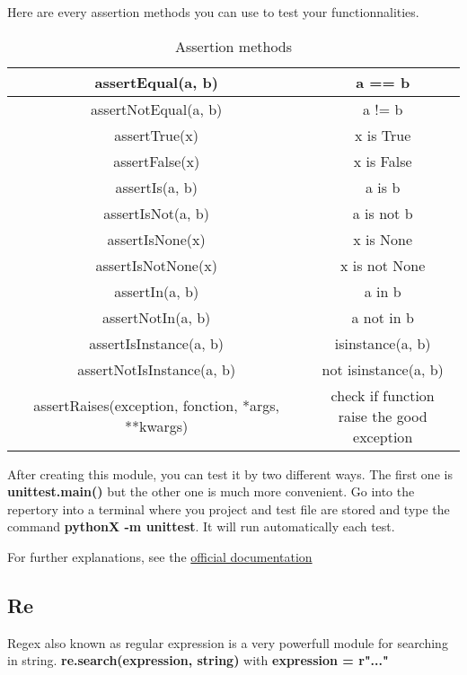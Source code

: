 \documentclass[a4paper, 12pt, titlepage]{scrartcl} %
\begin{document}
Here are every assertion methods you can use to test your functionnalities.
\begin{table}[h]
\begin{center}
{\renewcommand{\arraystretch}{1} %
{\setlength{\tabcolsep}{0.5cm} %
\begin{tabular}{|c|c|}
  \hline
  assertEqual(a, b) & a == b \\
  \hline
  assertNotEqual(a, b) & a != b \\
  \hline
  assertTrue(x) & x is True \\
  \hline
  assertFalse(x) & x is False \\
  \hline
  assertIs(a, b) & a is b \\
  \hline
  assertIsNot(a, b) & a is not b \\
  \hline
  assertIsNone(x) & x is None \\
  \hline
  assertIsNotNone(x) & x is not None \\
  \hline
  assertIn(a, b) & a in b \\
  \hline
  assertNotIn(a, b) & a not in b \\
  \hline
  assertIsInstance(a, b) & isinstance(a, b) \\
  \hline
  assertNotIsInstance(a, b) & not isinstance(a, b) \\
  \hline
  assertRaises(exception, fonction, *args, **kwargs) & \makecell{check if function \\ raise the good exception}  \\
  \hline
\end{tabular}}}
\end{center}
\caption{Assertion methods}
\end{table}

After creating this module, you can test it by two different ways. The first one is \textbf{unittest.main()} but the other one is much more convenient. Go into the repertory into a terminal where you project and test file are stored and type the command \textbf{pythonX -m unittest}. It will run automatically each test.

For further explanations, see the \href{https://docs.python.org/3/library/unittest.html}{official documentation}


\subsection{Re}
Regex also known as regular expression is a very powerfull module for searching in string. \textbf{re.search(expression, string)} with \textbf{expression = r"..."} \\
\end{document}
